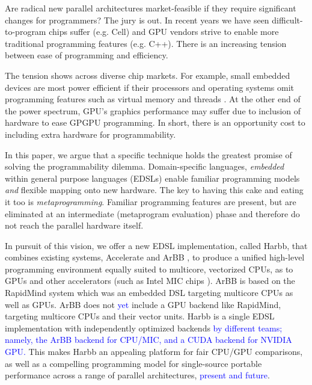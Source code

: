 \documentclass[conference]{IEEEtran}
\newcommand{\new}[1]{\textcolor{blue}{#1}}
\newcommand{\new}[1]{#1}
\newcommand{\systemname}[0]{{Harbb}}
\newcommand{\accarbb}[0]{\systemname{}}
\begin{document}
Are radical new parallel architectures market-feasible if they require
significant changes for programmers?  The jury is out.  In recent
years we have seen difficult-to-program chips suffer 
(e.g. Cell)
and
GPU vendors strive to enable more traditional programming features
\cite{fermi} (e.g. C++).  There is an increasing
tension between ease of programming and efficiency.

The tension  shows  across diverse chip markets.  For example,
small embedded devices are most power efficient if their processors and operating systems
omit programming features such as virtual memory and threads \cite{tinyos}.  
At the other end of the power spectrum, GPU's
graphics performance may suffer due to inclusion of hardware to ease
GPGPU programming.  In short, there is an opportunity cost to
including extra hardware for programmability.

In this paper, we argue 
that a specific technique holds the greatest promise of solving the programmability dilemma.
%
Domain-specific languages, {\em embedded} within general purpose
languages (EDSLs) 
 enable familiar programming models 
{\em and} flexible
mapping onto new hardware.  The key to having this cake and eating it
too is {\em metaprogramming}.  Familiar programming features are
present, but are eliminated at an intermediate (metaprogram evaluation)
phase and therefore do not reach the parallel hardware itself.


In pursuit of this vision, we offer a
% 
 new EDSL implementation, called \accarbb{}, that combines
existing systems, Accelerate \cite{Accelerate} and ArBB \cite{ArBB}, to produce a unified
high-level programming environment equally suited to multicore,
vectorized CPUs, as to GPUs and other accelerators (such as Intel MIC chips \cite{larrabee}).
%
ArBB is based on the RapidMind \cite{RapidMind} system which was an embedded 
DSL targeting multicore CPUs as well as GPUs. ArBB does not \new{yet} include a GPU 
backend like RapidMind, targeting multicore CPUs and their vector 
units. 
\fi{}
\systemname{} is a single EDSL implementation 
with independently optimized backends \new{by different teams; 
namely, the ArBB backend for CPU/MIC, and a CUDA backend for NVIDIA GPU.}
This makes
\systemname{} an appealing platform for fair CPU/GPU comparisons, 
as well as a compelling programming model for single-source portable performance across a range of
parallel architectures, \new{present and future}.
\end{document}
